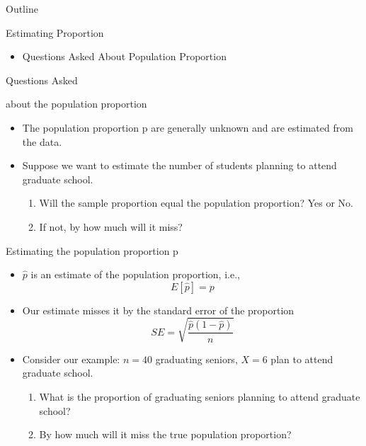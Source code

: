 \documentclass[14pt]{beamer}\usepackage[]{graphicx}\usepackage[]{color}
\begin{document}
\begin{frame}[fragile]{Outline}


Estimating Proportion

\begin{itemize}
 
\item<1-> Questions Asked About Population Proportion
\end{itemize}
\end{frame}

\begin{frame}[fragile]{Questions Asked}

about the population proportion

\begin{itemize}
\item<1-> The population proportion p are generally unknown and are  estimated from the data.
\item<2-> Suppose we want to estimate the number of students planning to  attend graduate school.
  \begin{enumerate}[1]
   \item<3-> Will the sample proportion equal the population proportion? Yes or  No.
    \item<4-> If not, by how much will it miss?
  \end{enumerate}
\end{itemize}
\end{frame}

\begin{frame}[fragile]{Estimating the population proportion p}

\begin{itemize}
\item<1-> $\hat{p}$ is an estimate of the population proportion, i.e.,
\begin{equation*}
E[ \hat{p} ] = p
\end{equation*}

\item<2-> Our estimate misses it by the standard error of the proportion
\begin{equation*}
SE = \sqrt{ \frac{ \hat{p} (1 - \hat{p})}{n}}
\end{equation*}

\item<3-> Consider our example: $n = 40$ graduating seniors, $X = 6$ plan to  attend graduate school.

\begin{enumerate}[1]
  \item<4-> What is the proportion of graduating seniors planning to attend  graduate school?
  \item<5-> By how much will it miss the true population proportion?
\end{enumerate}
\end{itemize}
\end{frame}
\end{document}
